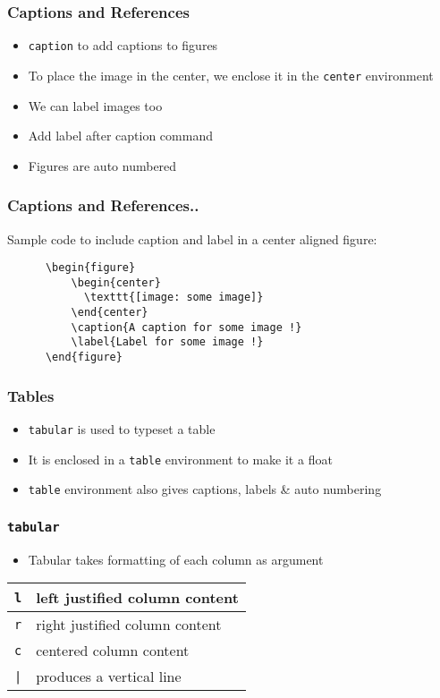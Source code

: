\documentclass[17pt,compress]{beamer}
\begin{document}
\begin{frame}
  \frametitle{Captions and References}
  \begin{itemize}
  \item \lstinline+caption+ to add captions to figures
  \item To place the image in the center, we enclose it in the
    \lstinline+center+ environment 
  \item We can label images too
  \item Add label after caption command
  \item Figures are auto numbered
  \end{itemize}
\end{frame}

\begin{frame}[fragile]
  \frametitle{Captions and References..}
  Sample code to include caption and label in a center aligned figure:
  \vspace{8pt}
  {\tiny
    \begin{verbatim}
      \begin{figure}
          \begin{center}
            \texttt{[image: some image]}
          \end{center}
          \caption{A caption for some image !}
          \label{Label for some image !}
      \end{figure}
    \end{verbatim}
  }
\end{frame}  


\begin{frame}[frame]
  \frametitle{Tables}
  \begin{itemize}
  \item \lstinline+tabular+ is used to typeset a table
  \item It is enclosed in a \lstinline+table+ environment to make it a
    float 
  \item \lstinline+table+ environment also gives captions, labels \& auto
    numbering  
  \end{itemize}
\end{frame}


\begin{frame}[fragile]
  \frametitle{\lstinline+tabular+}
  \begin{itemize}
  \item Tabular takes formatting of each column as argument
  \end{itemize}
  \begin{table}
    \begin{tabular}{|l|l|}
      \lstinline+l+ & left justified column content\\\hline
      \lstinline+r+ & right justified column content\\\hline
      \lstinline+c+ & centered column content\\\hline
      \lstinline+|+ & produces a vertical line\\
    \end{tabular}
  \end{table}
\end{frame}
\end{document}
